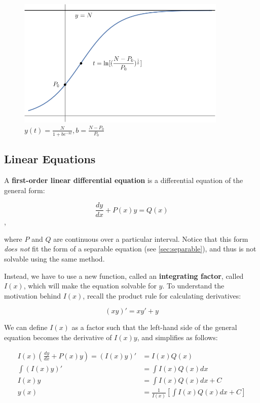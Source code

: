 \documentclass[12pt]{article}
\begin{document}
\begin{itemize}
    \begin{figure}[!ht]
        \centering
        \includegraphics[width=10cm]{misc/logisticmodel.png}
        \caption{$y(t) = \frac{N}{1+be^{-kt}}, b = \frac{N-P_0}{P_0}$}
        \label{fig:logisticmodel}
    \end{figure}
\end{itemize}

\subsection{Linear Equations}

A \textbf{first-order linear differential equation} is a differential equation of the general form:

$$\frac{dy}{dx} + P(x)y = Q(x)$$,

where $P$ and $Q$ are continuous over a particular interval. Notice that this form \textit{does not} fit the form of a separable equation (see \ref{sec:separable}), and thus is not solvable using the same method.

Instead, we have to use a new function, called an \textbf{integrating factor}, called $I(x)$, which will make the equation solvable for $y$. To understand the motivation behind $I(x)$, recall the product rule for calculating derivatives:

$$(xy)' = xy'+y$$

We can define $I(x)$ as a factor such that the left-hand side of the general equation becomes the derivative of $I(x)y$, and simplifies as follows:

\begin{equation}
    \begin{split}
    I(x)(\frac{dy}{dx} + P(x)y) = (I(x)y)' &= I(x)Q(x)\\
    \int (I(x)y)' &= \int I(x)Q(x) dx\\
    I(x)y &=  \int I(x)Q(x) dx + C\\
    y(x) &= \frac{1}{I(x)}[\int I(x)Q(x) dx + C]\\
    \end{split}
\end{equation}
\end{document}
